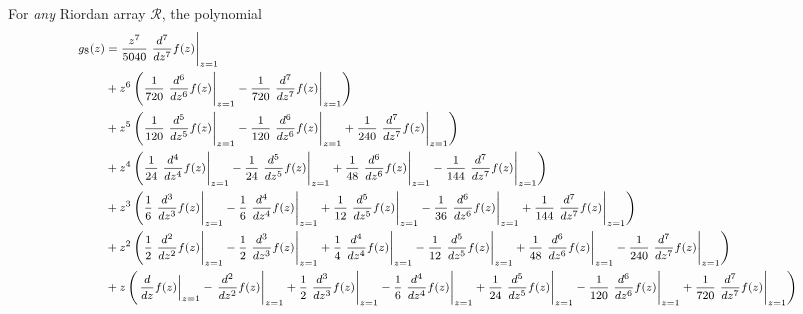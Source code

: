 \begin{remark}
For \textit{any} Riordan array $\mathcal{R}$, the polynomial 
\begin{displaymath}
\footnotesize
\begin{split}
g_{8}{\left (z \right )} &= \frac{z^{7}}{5040} \left.\frac{d^{7}}{d z^{7}}  f{\left (z \right )}\right|_{z=1} \\
                     &+ z^{6} \left(\frac{1}{720} \left.\frac{d^{6}}{d z^{6}}  f{\left (z \right )}\right|_{z=1} - \frac{1}{720} \left.\frac{d^{7}}{d z^{7}}  f{\left (z \right )}\right|_{z=1}\right) \\
                     &+ z^{5} \left(\frac{1}{120} \left.\frac{d^{5}}{d z^{5}}  f{\left (z \right )}\right|_{z=1} - \frac{1}{120} \left.\frac{d^{6}}{d z^{6}}  f{\left (z \right )}\right|_{z=1} + \frac{1}{240} \left.\frac{d^{7}}{d z^{7}}  f{\left (z \right )}\right|_{z=1}\right) \\
                     &+ z^{4} \left(\frac{1}{24} \left.\frac{d^{4}}{d z^{4}}  f{\left (z \right )}\right|_{z=1} - \frac{1}{24} \left.\frac{d^{5}}{d z^{5}}  f{\left (z \right )}\right|_{z=1} + \frac{1}{48} \left.\frac{d^{6}}{d z^{6}}  f{\left (z \right )}\right|_{z=1} - \frac{1}{144} \left.\frac{d^{7}}{d z^{7}}  f{\left (z \right )}\right|_{z=1}\right) \\
                     &+ z^{3} \left(\frac{1}{6} \left.\frac{d^{3}}{d z^{3}}  f{\left (z \right )}\right|_{z=1} - \frac{1}{6} \left.\frac{d^{4}}{d z^{4}}  f{\left (z \right )}\right|_{z=1} + \frac{1}{12} \left.\frac{d^{5}}{d z^{5}}  f{\left (z \right )}\right|_{z=1} - \frac{1}{36} \left.\frac{d^{6}}{d z^{6}}  f{\left (z \right )}\right|_{z=1} + \frac{1}{144} \left.\frac{d^{7}}{d z^{7}}  f{\left (z \right )}\right|_{z=1}\right) \\
                     &+ z^{2} \left(\frac{1}{2} \left.\frac{d^{2}}{d z^{2}}  f{\left (z \right )}\right|_{z=1} - \frac{1}{2} \left.\frac{d^{3}}{d z^{3}}  f{\left (z \right )}\right|_{z=1} + \frac{1}{4} \left.\frac{d^{4}}{d z^{4}}  f{\left (z \right )}\right|_{z=1} - \frac{1}{12} \left.\frac{d^{5}}{d z^{5}}  f{\left (z \right )}\right|_{z=1} + \frac{1}{48} \left.\frac{d^{6}}{d z^{6}}  f{\left (z \right )}\right|_{z=1} - \frac{1}{240} \left.\frac{d^{7}}{d z^{7}}  f{\left (z \right )}\right|_{z=1}\right) \\
                     &+ z \left(\left.\frac{d}{d z} f{\left (z \right )}\right|_{z=1} - \left.\frac{d^{2}}{d z^{2}}  f{\left (z \right )}\right|_{z=1} + \frac{1}{2} \left.\frac{d^{3}}{d z^{3}}  f{\left (z \right )}\right|_{z=1} - \frac{1}{6} \left.\frac{d^{4}}{d z^{4}}  f{\left (z \right )}\right|_{z=1} + \frac{1}{24} \left.\frac{d^{5}}{d z^{5}}  f{\left (z \right )}\right|_{z=1} - \frac{1}{120} \left.\frac{d^{6}}{d z^{6}}  f{\left (z \right )}\right|_{z=1} + \frac{1}{720} \left.\frac{d^{7}}{d z^{7}}  f{\left (z \right )}\right|_{z=1}\right) \\

\end{split}
\end{displaymath}
\end{remark}

